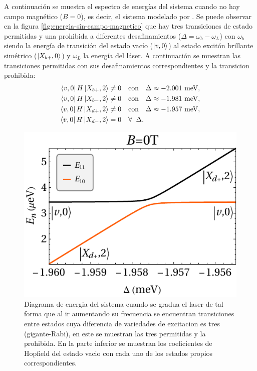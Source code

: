 \documentclass[../main.tex]{subfiles}
\begin{document}
A continuaci\'on se muestra el espectro de energ\'ias del sistema cuando no hay campo magn\'etico ($B=0$), es decir, el sistema modelado por \cite{Vargas2022}. Se puede observar en la figura \ref{fig:energia-sin-campo-magnetico} que hay tres transiciones de estado permitidas y una prohibida a diferentes desafinamientos ($\Delta = \omega_b-\omega_L$) con $\omega_b$ siendo la energ\'ia de transici\'on del estado vac\'io ($\ket{v,0}$) al estado excit\'on brillante sim\'etrico ($\ket{X_{b+},0}$) y $\omega_L$ la energ\'ia del l\'aser. A continuaci\'on se muestran las transiciones permitidas con sus desafinamientos correspondientes y la transicion prohibida:
\begin{align}
	\bra{v,0}H\ket{X_{b+},2} &\neq 0 \quad \text{con} \quad \Delta \approx -2.001 \text{ meV},\\
	\bra{v,0}H\ket{X_{b-},2} &\neq 0 \quad \text{con} \quad \Delta \approx -1.981 \text{ meV},\\
	\bra{v,0}H\ket{X_{d+},2} &\neq 0 \quad \text{con} \quad \Delta \approx -1.957 \text{ meV},\\
	\bra{v,0}H\ket{X_{d-},2} &= 0 \quad \forall \;\; \Delta.
\end{align}

\begin{figure}[bh]
	\centering
	\includegraphics[width=.8\linewidth]{../res/E11E10_B0}
	\caption{Diagrama de energia del sistema cuando se gradua el laser de tal forma que al ir aumentando su frecuencia se encuentran transiciones entre estados cuya diferencia de variedades de excitacion es tres (gigante-Rabi), en este se muestran las tres permitidas y la prohibida. En la parte inferior se muestran los coeficientes de Hopfield del estado vacio con cada uno de los estados propios correspondientes.}
	\label{fig:e11e10b0}
\end{figure}
\end{document}
